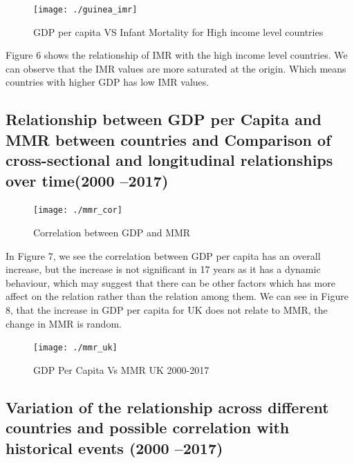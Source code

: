 \documentclass[
]{article}
\begin{document}
\begin{figure}[H]

{\centering \texttt{[image: ./guinea\_imr]} 

}

\caption{GDP per capita VS Infant Mortality for High income level countries}\label{fig:plot6}
\end{figure}

Figure 6 shows the relationship of IMR with the high income level
countries. We can observe that the IMR values are more saturated at the
origin. Which means countries with higher GDP has low IMR values.

\hypertarget{relationship-between-gdp-per-capita-and-mmr-between-countries-and-comparison-of-cross-sectional-and-longitudinal-relationships-over-time2000-2017}{%
\subsection{Relationship between GDP per Capita and MMR between
countries and Comparison of cross-sectional and longitudinal
relationships over time(2000
--2017)}\label{relationship-between-gdp-per-capita-and-mmr-between-countries-and-comparison-of-cross-sectional-and-longitudinal-relationships-over-time2000-2017}}

\begin{figure}[H]

{\centering \texttt{[image: ./mmr\_cor]} 

}

\caption{Correlation between GDP and MMR}\label{fig:plot7}
\end{figure}

In Figure 7, we see the correlation between GDP per capita has an
overall increase, but the increase is not significant in 17 years as it
has a dynamic behaviour, which may suggest that there can be other
factors which has more affect on the relation rather than the relation
among them. We can see in Figure 8, that the increase in GDP per capita
for UK does not relate to MMR, the change in MMR is random.

\begin{figure}[H]

{\centering \texttt{[image: ./mmr\_uk]} 

}

\caption{GDP Per Capita Vs MMR UK 2000-2017}\label{fig:plot8}
\end{figure}

\hypertarget{variation-of-the-relationship-across-different-countries-and-possible-correlation-with-historical-events-2000-2017-1}{%
\subsection{Variation of the relationship across different countries and
possible correlation with historical events (2000
--2017)}\label{variation-of-the-relationship-across-different-countries-and-possible-correlation-with-historical-events-2000-2017-1}}
\end{document}
